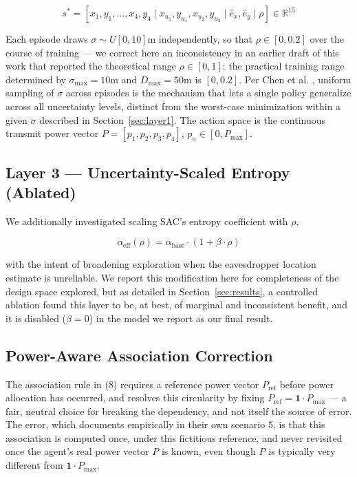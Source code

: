 \documentclass[conference]{IEEEtran}
\begin{document}
\begin{equation}
s^*=
[
x_1,y_1,\dots,x_4,y_4
\mid
x_{u_1},y_{u_1},x_{u_2},y_{u_2}
\mid
\hat{e}_x,\hat{e}_y
\mid
\rho
]
\in\mathbb{R}^{15}
\end{equation}

Each episode draws $\sigma \sim U[0,10]\text{m}$ independently, so that $\rho \in [0, 0.2]$ over the course of training --- we correct here an inconsistency in an earlier draft of this work that reported the theoretical range $\rho \in [0,1]$; the practical training range determined by $\sigma_{\max}=10$m and $D_{\max}=50$m is $[0,0.2]$. Per Chen et al. \cite{domainrand}, uniform sampling of $\sigma$ across episodes is the mechanism that lets a single policy generalize across all uncertainty levels, distinct from the worst-case minimization within a given $\sigma$ described in Section~\ref{sec:layer1}. The action space is the continuous transmit power vector $P=[p_1,p_2,p_3,p_4]$, $p_n \in [0,P_{\max}]$.

\subsection{Layer 3 --- Uncertainty-Scaled Entropy (Ablated)}
\label{sec:layer3}

We additionally investigated scaling SAC's entropy coefficient with $\rho$,

\begin{equation}
\alpha_{\text{eff}}(\rho)=
\alpha_{\text{base}}
\cdot
(1+\beta\cdot\rho)
\end{equation}

with the intent of broadening exploration when the eavesdropper location estimate is unreliable. We report this modification here for completeness of the design space explored, but as detailed in Section~\ref{sec:results}, a controlled ablation found this layer to be, at best, of marginal and inconsistent benefit, and it is disabled ($\beta=0$) in the model we report as our final result.

\subsection{Power-Aware Association Correction}
\label{sec:association}

The association rule in (8) requires a reference power vector $P_{\text{ref}}$ before power allocation has occurred, and \cite{hoseini} resolves this circularity by fixing $P_{\text{ref}} = \mathbf{1}\cdot P_{\max}$ --- a fair, neutral choice for breaking the dependency, and not itself the source of error. The error, which \cite{hoseini} documents empirically in their own scenario 5, is that this association is computed once, under this fictitious reference, and never revisited once the agent's real power vector $P$ is known, even though $P$ is typically very different from $\mathbf{1}\cdot P_{\max}$.
\end{document}
